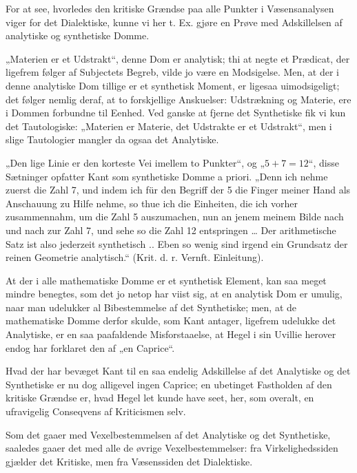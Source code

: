 \documentclass[12pt]{book}
\newcommand{\opage}[1]{\marginnote{\footnotesize\textit{[#1]}}}
\begin{document}
For at see, hvorledes den kritiske Grændse paa alle Punkter i Væsensanalysen viger for det
Dialektiske, kunne vi her t. Ex. gjøre en Prøve med Adskillelsen af analytiske og synthetiske Domme.

„Materien er et Udstrakt“, denne Dom er analytisk; thi at negte et Prædicat, der ligefrem følger af
Subjectets Begreb, vilde jo være en Modsigelse. Men, at der i denne analytiske Dom tillige er et
synthetisk Moment, er ligesaa uimodsigeligt; det følger nemlig deraf, at to forskjellige Anskuelser:
Udstrækning og Materie, ere i Dommen forbundne til Eenhed. Ved ganske at fjerne det Synthetiske fik
vi kun det Tautologiske: „Materien er Materie, det Udstrakte er et Udstrakt“, men i slige
Tautologier mangler da ogsaa det Analytiske.

„Den lige Linie er den korteste Vei imellem to Punkter“, og „$5 + 7 = 12$“, disse Sætninger
opfatter Kant som synthetiske Domme a priori. „Denn ich nehme zuerst die Zahl 7, und indem ich für
den Begriff der 5 die Finger meiner Hand als Anschauung zu Hilfe nehme, so thue ich die Einheiten,
die ich vorher zusammennahm, um die Zahl 5 auszumachen, nun an jenem meinem Bilde nach und nach zur
Zahl 7, und sehe so die Zahl 12 entspringen \ldots{} Der arithmetische Satz ist also jederzeit
synthetisch .. Eben so wenig sind irgend ein Grundsatz der reinen Geometrie analytisch.“
(Krit. d. r. Vernft. Einleitung).

At der i alle mathematiske Domme er et synthetisk Element, kan saa meget mindre benegtes, som det jo
netop
\opage{181} har viist sig, at en analytisk Dom er umulig, naar man udelukker al Bibestemmelse af det
Synthetiske; men, at de mathematiske Domme derfor skulde, som Kant antager, ligefrem udelukke det
Analytiske, er en saa paafaldende Misforstaaelse, at Hegel i sin Uvillie herover endog har forklaret
den af „en Caprice“.

Hvad der har bevæget Kant til en saa endelig Adskillelse af det Analytiske og det Synthetiske er nu
dog alligevel ingen Caprice; en ubetinget Fastholden af den kritiske Grændse er, hvad Hegel let
kunde have seet, her, som overalt, en ufravigelig Conseqvens af Kriticismen selv.

Som det gaaer med Vexelbestemmelsen af det Analytiske og det Synthetiske, saaledes gaaer det med alle
de øvrige Vexelbestemmelser: fra Virkelighedssiden gjælder det Kritiske, men fra Væsenssiden det
Dialektiske.
\end{document}

